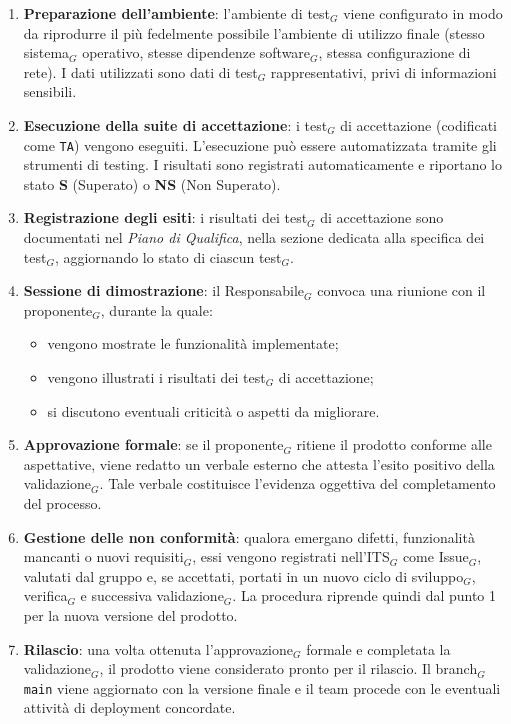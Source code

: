 \documentclass[a4paper, 10pt]{article}
\begin{document}
\begin{enumerate}
    \item \textbf{Preparazione dell'ambiente}: l'ambiente di test$_G$ viene configurato in modo da riprodurre il più fedelmente possibile l'ambiente di utilizzo finale (stesso sistema$_G$ operativo, stesse dipendenze software$_G$, stessa configurazione di rete). I dati utilizzati sono dati di test$_G$ rappresentativi, privi di informazioni sensibili.
    
    \item \textbf{Esecuzione della suite di accettazione}: i test$_G$ di accettazione (codificati come \texttt{TA}) vengono eseguiti. L'esecuzione può essere automatizzata tramite gli strumenti di testing. I risultati sono registrati automaticamente e riportano lo stato \textbf{S} (Superato) o \textbf{NS} (Non Superato).
    
    \item \textbf{Registrazione degli esiti}: i risultati dei test$_G$ di accettazione sono documentati nel \emph{Piano di Qualifica}, nella sezione dedicata alla specifica dei test$_G$, aggiornando lo stato di ciascun test$_G$.
    
    \item \textbf{Sessione di dimostrazione}: il Responsabile$_G$ convoca una riunione con il proponente$_G$, durante la quale:
    \begin{itemize}
        \item vengono mostrate le funzionalità implementate;
        \item vengono illustrati i risultati dei test$_G$ di accettazione;
        \item si discutono eventuali criticità o aspetti da migliorare.
    \end{itemize}
    
    \item \textbf{Approvazione formale}: se il proponente$_G$ ritiene il prodotto conforme alle aspettative, viene redatto un verbale esterno che attesta l'esito positivo della validazione$_G$. Tale verbale costituisce l'evidenza oggettiva del completamento del processo.
    
    \item \textbf{Gestione delle non conformità}: qualora emergano difetti, funzionalità mancanti o nuovi requisiti$_G$, essi vengono registrati nell'ITS$_G$ come Issue$_G$, valutati dal gruppo e, se accettati, portati in un nuovo ciclo di sviluppo$_G$, verifica$_G$ e successiva validazione$_G$. La procedura riprende quindi dal punto 1 per la nuova versione del prodotto.
    
    \item \textbf{Rilascio}: una volta ottenuta l'approvazione$_G$ formale e completata la validazione$_G$, il prodotto viene considerato pronto per il rilascio. Il branch$_G$ \texttt{main} viene aggiornato con la versione finale e il team procede con le eventuali attività di deployment concordate.
\end{enumerate}
\end{document}
